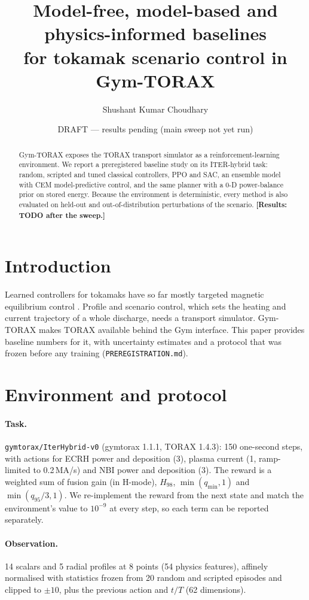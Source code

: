 \documentclass[11pt]{article}
\title{Model-free, model-based and physics-informed baselines\\for tokamak scenario control in Gym-TORAX}
\author{Shushant Kumar Choudhary}
\date{DRAFT --- results pending (main sweep not yet run)}
\begin{document}
\maketitle

\begin{abstract}
Gym-TORAX \citep{mouchamps2025gymtorax} exposes the TORAX transport simulator \citep{citrin2024torax} as a
reinforcement-learning environment. We report a preregistered baseline study on its ITER-hybrid task: random,
scripted and tuned classical controllers, PPO and SAC, an ensemble model with CEM model-predictive control, and the
same planner with a 0-D power-balance prior on stored energy. Because the environment is deterministic, every
method is also evaluated on held-out and out-of-distribution perturbations of the scenario.
\textbf{[Results: TODO after the sweep.]}
\end{abstract}

\section{Introduction}
Learned controllers for tokamaks have so far mostly targeted magnetic equilibrium control \citep{degrave2022magnetic}.
Profile and scenario control, which sets the heating and current trajectory of a whole discharge, needs a transport
simulator. Gym-TORAX makes TORAX available behind the Gym interface. This paper provides baseline numbers for it,
with uncertainty estimates and a protocol that was frozen before any training (\texttt{PREREGISTRATION.md}).

\section{Environment and protocol}
\paragraph{Task.} \texttt{gymtorax/IterHybrid-v0} (gymtorax 1.1.1, TORAX 1.4.3): 150 one-second steps, with
actions for ECRH power and deposition (3), plasma current (1, ramp-limited to 0.2\,MA/s) and NBI power and
deposition (3). The reward is a weighted sum of fusion gain (in H-mode), $H_{98}$, $\min(q_{\min},1)$ and
$\min(q_{95}/3,1)$. We re-implement the reward from the next state and match the environment's value to $10^{-9}$
at every step, so each term can be reported separately.
\paragraph{Observation.} 14 scalars and 5 radial profiles at 8 points (54 physics features), affinely
normalised with statistics frozen from 20 random and scripted episodes and clipped to $\pm10$, plus the previous
action and $t/T$ (62 dimensions).
\end{document}
